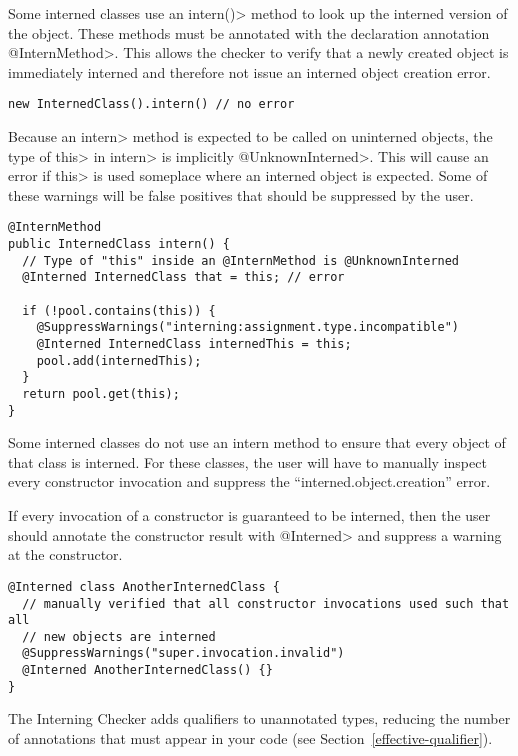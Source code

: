 Some interned classes use an \<intern()> method to look up the interned version of
the object. These methods must be annotated with the declaration annotation
\<@InternMethod>. This allows the checker to verify that a newly created object
is immediately interned and therefore not issue an interned object creation
error.

\begin{Verbatim}
new InternedClass().intern() // no error
\end{Verbatim}

Because an \<intern> method is expected to be called on uninterned objects, the
type of \<this> in \<intern> is implicitly \<@UnknownInterned>. This will cause an
error if \<this> is used someplace where an interned object is expected.  Some
of these warnings will be false positives that should be suppressed by the
user.

\begin{Verbatim}
@InternMethod
public InternedClass intern() {
  // Type of "this" inside an @InternMethod is @UnknownInterned
  @Interned InternedClass that = this; // error

  if (!pool.contains(this)) {
    @SuppressWarnings("interning:assignment.type.incompatible")
    @Interned InternedClass internedThis = this;
    pool.add(internedThis);
  }
  return pool.get(this);
}
\end{Verbatim}

Some interned classes do not use an intern method to ensure that every object
of that class is interned.  For these classes, the user will have to manually
inspect every constructor invocation and suppress the ``interned.object.creation''
error.

If every invocation of a constructor is guaranteed to be interned, then the
user should annotate the constructor result with \<@Interned> and suppress a
warning at the constructor.

\begin{Verbatim}
@Interned class AnotherInternedClass {
  // manually verified that all constructor invocations used such that all
  // new objects are interned
  @SuppressWarnings("super.invocation.invalid")
  @Interned AnotherInternedClass() {}
}
\end{Verbatim}



The Interning Checker
adds qualifiers to unannotated types, reducing the number of annotations that must
appear in your code (see Section~\ref{effective-qualifier}).

